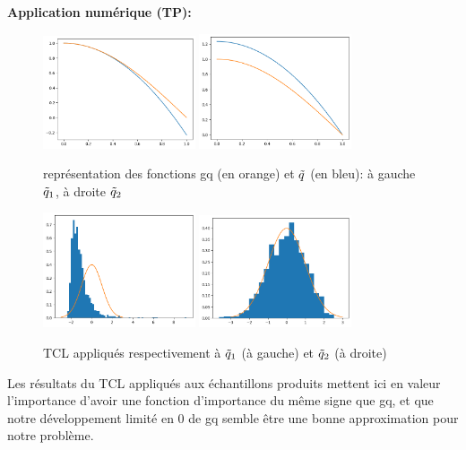 \documentclass{article}
\begin{document}
\textbf{Application numérique (TP):}

\begin{figure}[ht]
\centering
\includegraphics[width=0.4\textwidth]{TP1/DL_ordre2_g.png}
\includegraphics[width=0.4\textwidth]{TP1/DL_ordre2_corrige.png}
\caption{représentation des fonctions gq (en orange) et $\Tilde{q}$ (en bleu): à gauche $\Tilde{q}_1$, à droite $\Tilde{q}_2$}
\end{figure}

\begin{figure}[ht]
\centering
\includegraphics[width=0.4\textwidth]{TP1/IS_TCL_DL_ordre2.png}
\includegraphics[width=0.4\textwidth]{TP1/IS_TCL_DL_ordre2_corrige.png}
\caption{TCL appliqués respectivement à $\Tilde{q}_1$ (à gauche) et $\Tilde{q}_2$ (à droite)}
\end{figure}

Les résultats du TCL appliqués aux échantillons produits mettent ici en valeur l'importance d'avoir une fonction d'importance du même signe que gq, et que notre développement limité en 0 de gq semble être une bonne approximation pour notre problème.\\
\end{document}

